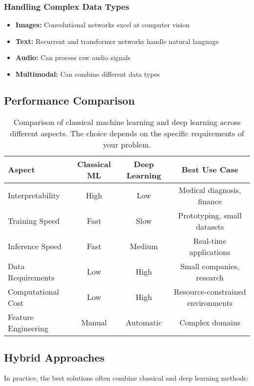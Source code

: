 \subsubsection{Handling Complex Data Types}
\begin{itemize}
    \item \textbf{Images:} Convolutional networks excel at computer vision
    \item \textbf{Text:} Recurrent and transformer networks handle natural language
    \item \textbf{Audio:} Can process raw audio signals
    \item \textbf{Multimodal:} Can combine different data types
\end{itemize}

\subsection{Performance Comparison}

\begin{table}[htbp]
\centering
\begin{tabular}{lccc}
\toprule
Aspect & Classical ML & Deep Learning & Best Use Case \\
\midrule
Interpretability & High & Low & Medical diagnosis, finance \\
Training Speed & Fast & Slow & Prototyping, small datasets \\
Inference Speed & Fast & Medium & Real-time applications \\
Data Requirements & Low & High & Small companies, research \\
Computational Cost & Low & High & Resource-constrained environments \\
Feature Engineering & Manual & Automatic & Complex domains \\
\bottomrule
\end{tabular}
\caption{Comparison of classical machine learning and deep learning across different aspects. The choice depends on the specific requirements of your problem.}
\label{tab:ml-vs-dl-comparison}
\end{table}

\subsection{Hybrid Approaches}

In practice, the best solutions often combine classical and deep learning methods:

